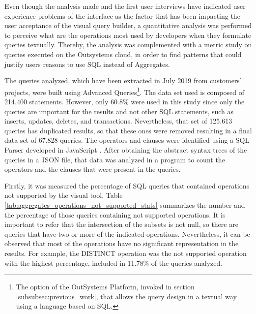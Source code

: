 Even though the analysis made and the first user interviews have indicated user experience problems of the interface as the factor that has been impacting the user acceptance of the visual query builder, a quantitative analysis was performed to perceive what are the operations most used by developers when they formulate queries textually. Thereby, the analysis was complemented with a metric study on queries executed on the Outsystems cloud, in order to find patterns that could justify users reasons to use \gls{SQL} instead of Aggregates. 

The queries analyzed, which have been extracted in July 2019 from customers’ projects, were built using Advanced Queries\footnote{The option of the OutSystems Platform, invoked in section \ref{subsubsec:previous_work}, that allows the query design in a textual way using a language based on \gls{SQL}.}. The data set used is composed of 214.400 statements. However, only 60.8\% were used in this study since only the queries are important for the results and not other SQL statements, such as inserts, updates, deletes, and transactions. Nevertheless, that set of 125.613 queries has duplicated results, so that these ones were removed resulting in a final data set of 67.828 queries. The operators and clauses were identified using a \gls{SQL} Parser developed in JavaScript \cite{jsSqlParser}. After obtaining the abstract syntax trees of the queries in a JSON file, that data was analyzed in a program to count the operators and the clauses that were present in the queries. 

Firstly, it was measured the percentage of \gls{SQL} queries that contained operations not supported by the visual tool. Table \ref{tab:aggregates_operations_not_supported_stats} summarizes the number and the percentage of those queries containing not supported operations. It is important to refer that the intersection of the subsets is not null, so there are queries that have two or more of the indicated operations. Nevertheless, it can be observed that most of the operations have no significant representation in the results. For example, the DISTINCT operation was the not supported operation with the highest percentage, included in 11.78\% of the queries analyzed.


